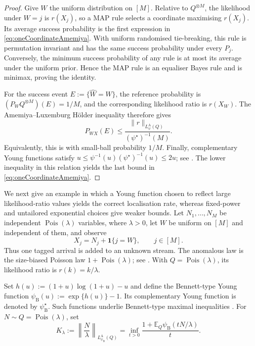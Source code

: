 \documentclass[11pt]{article}
\theoremstyle{definition}
\theoremstyle{remark}
\newcommand{\Ee}{\mathbb E}
\newcommand{\1}{\boldsymbol{1}}
\newcommand{\Pois}{\operatorname{Pois}}
\begin{document}
\begin{proof}
Give \(W\) the uniform distribution on \([M]\). Relative to
\(Q^{\otimes M}\), the likelihood under \(W=j\) is \(r(X_j)\), so a MAP rule
selects a coordinate maximising \(r(X_j)\). Its average success probability
is the first expression in \eqref{eq:oneCoordinateAmemiya}. With uniform
randomised tie-breaking, this rule is permutation invariant and has the same
success probability under every \(P_j\). Conversely, the minimum success
probability of any rule is at most its average under the uniform prior.
Hence the MAP rule is an equaliser Bayes rule and is minimax, proving the
identity.

For the success event \(E:=\{\widehat W=W\}\), the reference probability is
\((P_WQ^{\otimes M})(E)=1/M\), and the corresponding likelihood ratio is
\(r(X_W)\). The Amemiya--Luxemburg H\"older inequality therefore gives
\[
P_{WX}(E)
\le
\frac{\|r\|_{L_\psi^{\mathrm A}(Q)}}
     {(\psi^\star)^{-1}(M)}.
\]
Equivalently, this is
 with small-ball probability \(1/M\). Finally,
complementary Young functions satisfy
\(u\le\psi^{-1}(u)(\psi^\star)^{-1}(u)\le2u\); see
\cite[Chapter~2]{RaoRen1991}. The lower inequality in this relation yields
the last bound in \eqref{eq:oneCoordinateAmemiya}.
\end{proof}

We next give an example in which a Young function chosen to reflect large
likelihood-ratio values yields the correct localisation rate, whereas
fixed-power and untailored exponential choices give weaker bounds. Let
\(N_1,\ldots,N_M\) be independent \(\Pois(\lambda)\) variables, where
\(\lambda>0\), let \(W\) be uniform on \([M]\) and independent of them, and
observe
\begin{equation}
X_j=N_j+\1\{j=W\},
\qquad j\in[M].
\label{eq:taggedPoissonModel}
\end{equation}
Thus one tagged arrival is added to an unknown stream. The anomalous law is
the size-biased Poisson law \(1+\Pois(\lambda)\); see
\cite[Section~2]{ArratiaGoldsteinKochman2019}. With
\(Q=\Pois(\lambda)\), its likelihood ratio is \(r(k)=k/\lambda\).

Set \(h(u):=(1+u)\log(1+u)-u\) and define the Bennett-type Young function
\(\psi_{\mathrm B}(u):=\exp\{h(u)\}-1\). Its complementary Young function
is denoted by \(\psi_{\mathrm B}^\star\). Such functions underlie
Bennett-type maximal inequalities \cite{Wellner2017}. For
\(N\sim Q=\Pois(\lambda)\), set
\begin{equation}
K_\lambda
:=
\left\|\frac{N}{\lambda}\right\|_
{L_{\psi_{\mathrm B}}^{\mathrm A}(Q)}
=
\inf_{t>0}
\frac{1+\Ee_Q\psi_{\mathrm B}(tN/\lambda)}{t}.
\label{eq:taggedPoissonAmemiyaNorm}
\end{equation}
\end{document}
